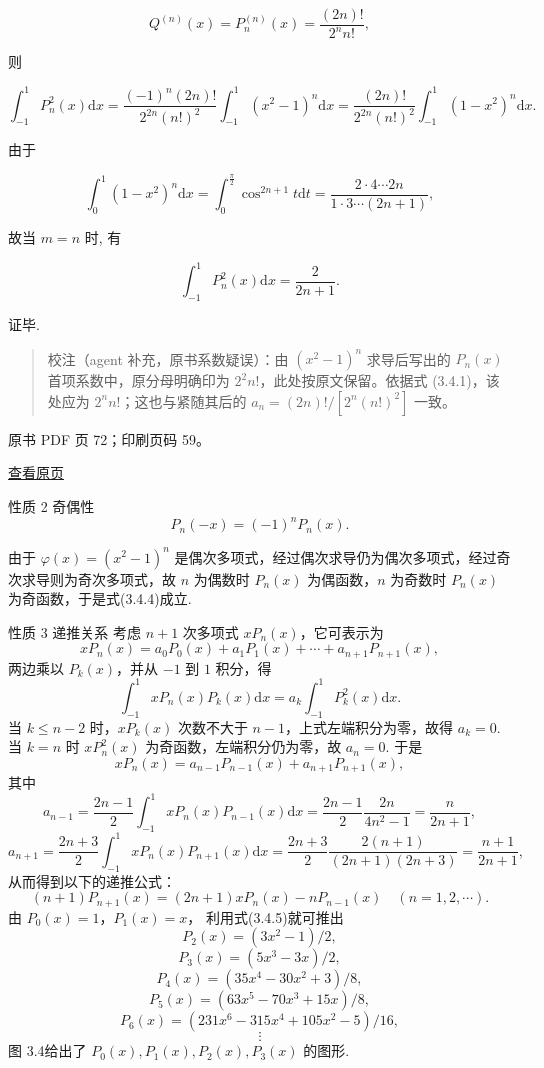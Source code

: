 \[
Q^{(n)}(x) = P_n^{(n)}(x) = \frac{(2n)!}{2^n n!},
\]

则

\[
\int_{-1}^{1} P_n^2(x) \mathrm{d}x = \frac{(-1)^n (2n)!}{2^{2n} (n!)^2} \int_{-1}^{1} (x^2 - 1)^n \mathrm{d}x = \frac{(2n)!}{2^{2n} (n!)^2} \int_{-1}^{1} (1 - x^2)^n \mathrm{d}x.
\]

由于

\[
\int_{0}^{1} (1 - x^2)^n \mathrm{d}x = \int_{0}^{\frac{\pi}{2}} \cos^{2n+1} t \mathrm{d}t = \frac{2 \cdot 4 \cdots 2n}{1 \cdot 3 \cdots (2n+1)},
\]

故当 \(m = n\) 时, 有

\[
\int_{-1}^{1} P_n^2(x) \mathrm{d}x = \frac{2}{2n+1}.
\]

证毕.

\begin{quote}
校注（agent 补充，原书系数疑误）：由 \((x^2-1)^n\) 求导后写出的 \(P_n(x)\) 首项系数中，原分母明确印为 \(2^2n!\)，此处按原文保留。依据式 (3.4.1)，该处应为 \(2^nn!\)；这也与紧随其后的 \(a_n=(2n)!/[2^n(n!)^2]\) 一致。
\end{quote}

\clearpage

原书 PDF 页 72；印刷页码 59。

\href{source-images/pdf-072.jpeg}{查看原页}

性质 2 奇偶性 \[
P_n(-x) = (-1)^n P_n(x). \tag{3.4.4}
\]

由于 \(\varphi(x) = (x^2 - 1)^n\) 是偶次多项式，经过偶次求导仍为偶次多项式，经过奇次求导则为奇次多项式，故 \(n\) 为偶数时 \(P_n(x)\) 为偶函数，\(n\) 为奇数时 \(P_n(x)\) 为奇函数，于是式(3.4.4)成立.

性质 3 递推关系 考虑 \(n+1\) 次多项式 \(xP_n(x)\)，它可表示为 \[
xP_n(x) = a_0P_0(x) + a_1P_1(x) + \cdots + a_{n+1}P_{n+1}(x),
\] 两边乘以 \(P_k(x)\)，并从 \(-1\) 到 \(1\) 积分，得 \[
\int_{-1}^{1} xP_n(x)P_k(x) \mathrm{d}x = a_k \int_{-1}^{1} P_k^2(x) \mathrm{d}x.
\] 当 \(k \leqslant n-2\) 时，\(xP_k(x)\) 次数不大于 \(n-1\)，上式左端积分为零，故得 \(a_k = 0\). 当 \(k=n\) 时 \(xP_n^2(x)\) 为奇函数，左端积分仍为零，故 \(a_n = 0\). 于是 \[
xP_n(x) = a_{n-1}P_{n-1}(x) + a_{n+1}P_{n+1}(x),
\] 其中 \[
a_{n-1} = \frac{2n-1}{2} \int_{-1}^{1} xP_n(x)P_{n-1}(x) \mathrm{d}x = \frac{2n-1}{2} \frac{2n}{4n^2-1} = \frac{n}{2n+1},
\] \[
a_{n+1} = \frac{2n+3}{2} \int_{-1}^{1} xP_n(x)P_{n+1}(x) \mathrm{d}x = \frac{2n+3}{2} \frac{2(n+1)}{(2n+1)(2n+3)} = \frac{n+1}{2n+1},
\] 从而得到以下的递推公式： \[
(n+1)P_{n+1}(x) = (2n+1)xP_n(x) - nP_{n-1}(x) \quad (n=1,2,\cdots). \tag{3.4.5}
\] 由 \(P_0(x)=1\)，\(P_1(x)=x\)， 利用式(3.4.5)就可推出 \[
P_2(x) = (3x^2 - 1)/2,
\] \[
P_3(x) = (5x^3 - 3x)/2,
\] \[
P_4(x) = (35x^4 - 30x^2 + 3)/8,
\] \[
P_5(x) = (63x^5 - 70x^3 + 15x)/8,
\] \[
P_6(x) = (231x^6 - 315x^4 + 105x^2 - 5)/16,
\] \[
\vdots
\] 图 3.4给出了 \(P_0(x), P_1(x), P_2(x), P_3(x)\) 的图形.

